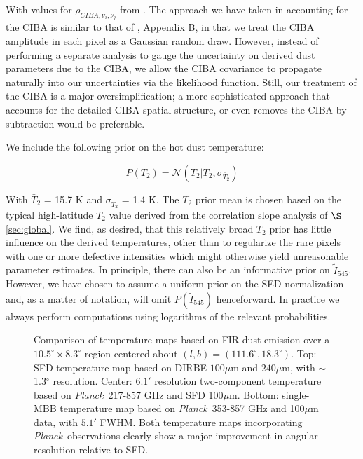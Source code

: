 \documentclass{emulateapj}
\newcommand{\PLANCK}{{\it Planck}}
\begin{document}
With values for $\rho_{CIBA, \nu_i, \nu_j}$ from \cite{covarciba}. The approach
we have taken in accounting for the CIBA is similar to that of 
\cite{planckdust}, Appendix B, in that we treat the CIBA amplitude in each 
pixel as a Gaussian random draw. However, instead of performing a separate 
analysis to gauge the uncertainty on derived dust parameters due to the CIBA, 
we allow the CIBA covariance to propagate naturally into our uncertainties via 
the likelihood function. Still, our treatment of the CIBA is a major 
oversimplification; a more sophisticated approach that accounts for the 
detailed CIBA spatial structure, or even removes the CIBA by subtraction would
be preferable. 

We include the following prior on the hot dust temperature:

\begin{equation} \label{equ:t2prior}
P(T_2) = \mathcal{N}(T_2|\bar{T}_2, \sigma_{\bar{T}_2})
\end{equation}

With $\bar{T}_2$ = 15.7 K and $\sigma_{\bar{T}_2}$ = 1.4 K. The $T_2$ prior 
mean is chosen based on the typical high-latitude $T_2$ value derived from
the correlation slope analysis of $\S$\ref{sec:global}. We find, as 
desired, that this relatively broad $T_2$ prior has little influence on the 
derived temperatures, other than to regularize the rare pixels with one or more
defective intensities which might otherwise yield unreasonable parameter
estimates. In principle, there can also be an informative prior on 
$\tilde{I}_{545}$. However, we have chosen to assume a uniform prior on the SED
normalization and, as a matter of notation, will omit $P(\tilde{I}_{545})$ 
henceforward. In practice we always perform computations using logarithms of 
the relevant probabilities.

\begin{figure}
\begin{center}
\caption{\label{fig:comparison} Comparison of temperature maps based on FIR 
dust emission over a $10.5^{\circ}\times8.3^{\circ}$ region centered about 
$(l,b) = (111.6^{\circ}, 18.3^{\circ})$. Top: SFD temperature map based on 
DIRBE $100\mu$m and $240\mu$m, with $\sim$1.3$^{\circ}$ resolution. Center: 
$6.1'$ resolution two-component temperature based on \PLANCK~217-857 GHz and 
SFD 100$\mu$m. Bottom: \cite{planckdust} single-MBB temperature map based on 
\PLANCK~353-857 GHz and 100$\mu$m data, with $5.1'$ FWHM. Both temperature maps
incorporating \PLANCK~observations clearly show a major improvement in angular 
resolution relative to SFD.}
\end{center}
\end{figure}
\end{document}
